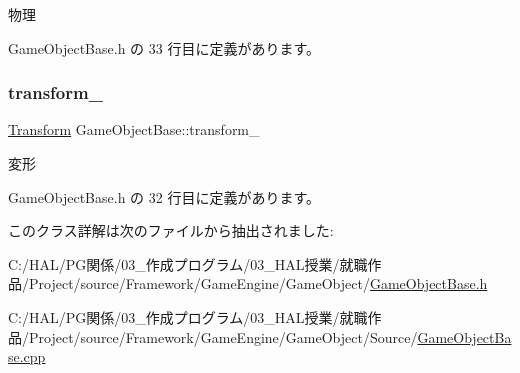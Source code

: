 物理 



 Game\+Object\+Base.\+h の 33 行目に定義があります。

\mbox{\label{class_game_object_base_a9e84cc5213c2ee289e2ca2c8b0fc73ba}} 
\subsubsection{\texorpdfstring{transform\+\_\+}{transform\_}}
{\footnotesize\ttfamily \mbox{\hyperlink{class_transform}{Transform}} Game\+Object\+Base\+::transform\+\_\+\hspace{0.3cm}{\ttfamily [private]}}



変形 



 Game\+Object\+Base.\+h の 32 行目に定義があります。



このクラス詳解は次のファイルから抽出されました\+:\begin{DoxyCompactItemize}
\item 
C\+:/\+H\+A\+L/\+P\+G関係/03\+\_\+作成プログラム/03\+\_\+\+H\+A\+L授業/就職作品/\+Project/source/\+Framework/\+Game\+Engine/\+Game\+Object/\mbox{\hyperlink{_game_object_base_8h}{Game\+Object\+Base.\+h}}\item 
C\+:/\+H\+A\+L/\+P\+G関係/03\+\_\+作成プログラム/03\+\_\+\+H\+A\+L授業/就職作品/\+Project/source/\+Framework/\+Game\+Engine/\+Game\+Object/\+Source/\mbox{\hyperlink{_game_object_base_8cpp}{Game\+Object\+Base.\+cpp}}\end{DoxyCompactItemize}
